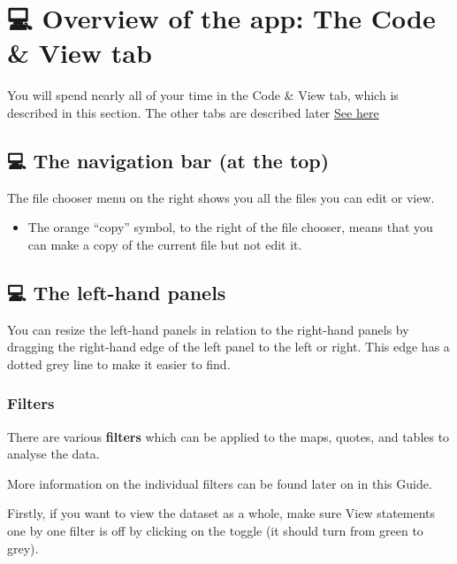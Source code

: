 \documentclass[
]{book}
\providecommand{\tightlist}{%
  \setlength{\itemsep}{0pt}\setlength{\parskip}{0pt}}
\begin{document}
\hypertarget{overview-of-the-app-the-code-view-tab}{%
\section{💻 Overview of the app: The Code \& View tab}\label{overview-of-the-app-the-code-view-tab}}

You will spend nearly all of your time in the Code \& View tab, which is described in this section. The other tabs are described later \protect\hyperlink{restoftheapp}{See here}

\hypertarget{the-navigation-bar-at-the-top}{%
\subsection{💻 The navigation bar (at the top)}\label{the-navigation-bar-at-the-top}}

The file chooser menu on the right shows you all the files you can edit or view.

\begin{itemize}
\tightlist
\item
  The orange ``copy'' symbol, to the right of the file chooser, means that you can make a copy of the current file but not edit it.
\end{itemize}

\hypertarget{the-left-hand-panels}{%
\subsection{💻 The left-hand panels}\label{the-left-hand-panels}}

You can resize the left-hand panels in relation to the right-hand panels by dragging the right-hand edge of the left panel to the left or right. This edge has a dotted grey line to make it easier to find.

\hypertarget{filters}{%
\subsubsection{Filters}\label{filters}}

There are various \textbf{filters} which can be applied to the maps, quotes, and tables to analyse the data.

More information on the individual filters can be found later on in this Guide.

Firstly, if you want to view the dataset as a whole, make sure View statements one by one filter is off by clicking on the toggle (it should turn from green to grey).
\end{document}
